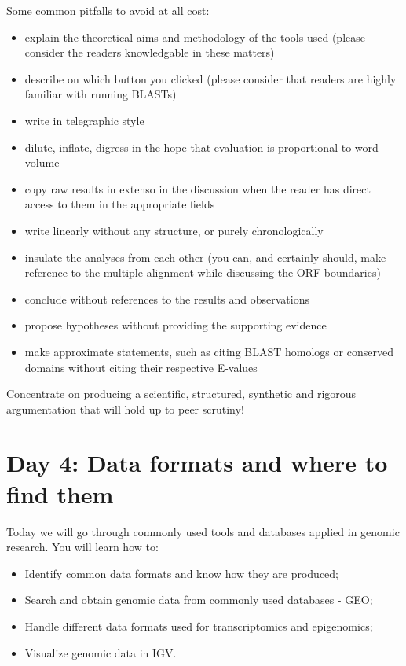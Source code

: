 \documentclass[
]{book}
\providecommand{\tightlist}{%
  \setlength{\itemsep}{0pt}\setlength{\parskip}{0pt}}
\begin{document}
Some common pitfalls to avoid at all cost:

\begin{itemize}
\tightlist
\item
  explain the theoretical aims and methodology of the tools used (please consider the readers knowledgable in these matters)
\item
  describe on which button you clicked (please consider that readers are highly familiar with running BLASTs)
\item
  write in telegraphic style
\item
  dilute, inflate, digress in the hope that evaluation is proportional to word volume
\item
  copy raw results in extenso in the discussion when the reader has direct access to them in the appropriate fields
\item
  write linearly without any structure, or purely chronologically
\item
  insulate the analyses from each other (you can, and certainly should, make reference to the multiple alignment while discussing the ORF boundaries)
\item
  conclude without references to the results and observations
\item
  propose hypotheses without providing the supporting evidence
\item
  make approximate statements, such as citing BLAST homologs or conserved domains without citing their respective E-values
\end{itemize}

Concentrate on producing a scientific, structured, synthetic and rigorous argumentation that will hold up to peer scrutiny!

\hypertarget{day-4-data-formats-and-where-to-find-them}{%
\section{Day 4: Data formats and where to find them}\label{day-4-data-formats-and-where-to-find-them}}

Today we will go through commonly used tools and databases applied in genomic research. You will learn how to:

\begin{itemize}
\tightlist
\item
  Identify common data formats and know how they are produced;\\
\item
  Search and obtain genomic data from commonly used databases - GEO;\\
\item
  Handle different data formats used for transcriptomics and epigenomics;\\
\item
  Visualize genomic data in IGV.
\end{itemize}
\end{document}
